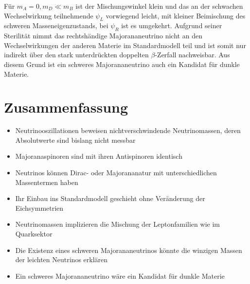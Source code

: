 \documentclass[10pt, letterpaper]{article}
\begin{document}
Für $m_{A}=0, m_{D} \ll m_{B}$ ist der Mischungswinkel klein und das an der schwachen Wechselwirkung teilnehmende $\psi_{L}$ vorwiegend leicht, mit kleiner Beimischung des schweren Masseneigenzustands, bei $\psi_{R}$ ist es umgekehrt. Aufgrund seiner Sterilität nimmt das rechtshändige Majorananeutrino nicht an den Wechselwirkungen der anderen Materie im Standardmodell teil und ist somit nur indirekt über den stark unterdrückten doppelten $\beta$-Zerfall nachweisbar. Aus diesem Grund ist ein schweres Majorananeutrino auch ein Kandidat für dunkle Materie.

\section*{Zusammenfassung}
\begin{itemize}
  \item Neutrinooszillationen beweisen nichtverschwindende Neutrinomassen, deren Absolutwerte sind bislang nicht messbar
  \item Majoranaspinoren sind mit ihren Antispinoren identisch
  \item Neutrinos können Dirac- oder Majorananatur mit unterschiedlichen Massentermen haben
  \item Ihr Einbau ins Standardmodell geschieht ohne Veränderung der Eichsymmetrien
  \item Neutrinomassen implizieren die Mischung der Leptonfamilien wie im Quarksektor
  \item Die Existenz eines schweren Majorananeutrinos könnte die winzigen Massen der leichten Neutrinos erklären
  \item Ein schweres Majorananeutrino wäre ein Kandidat für dunkle Materie
\end{itemize}



\pagebreak
\printbibliography
\end{document}
